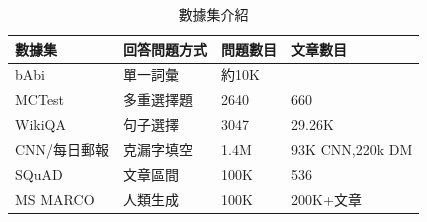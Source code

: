 \begin{table}
    \caption{數據集介紹}
    \label{table:dataset}
    \centering
    \begin{tabular}[t]{|l|l|l|l|}
        \hline 
        數據集          &回答問題方式   &問題數目   &文章數目 \\
        \hline
        bAbi            &單一詞彙       &約10K      &  \\
        \hline
        MCTest          &多重選擇題     &2640       &660 \\
        \hline
        WikiQA          &句子選擇       &3047       &29.26K\\
        \hline
        CNN/每日郵報    &克漏字填空     &1.4M       &93K CNN,220k DM\\
        \hline
        SQuAD           &文章區間       &100K       &536\\
        \hline
        MS MARCO        &人類生成       &100K       &200K+文章\\
        \hline
    \end{tabular}
\end{table}
